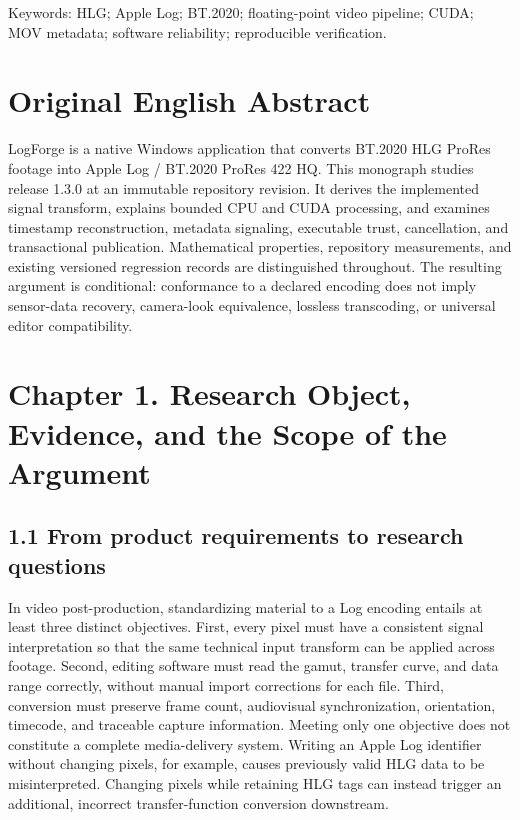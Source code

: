 \documentclass[11pt,a4paper,openany]{book}
\begin{document}
Keywords: HLG; Apple Log; BT.2020; floating-point video pipeline; CUDA; MOV metadata; software reliability; reproducible verification.


\chapter*{Original English Abstract}
LogForge is a native Windows application that converts BT.2020 HLG ProRes footage into Apple Log / BT.2020 ProRes 422 HQ. This monograph studies release 1.3.0 at an immutable repository revision. It derives the implemented signal transform, explains bounded CPU and CUDA processing, and examines timestamp reconstruction, metadata signaling, executable trust, cancellation, and transactional publication. Mathematical properties, repository measurements, and existing versioned regression records are distinguished throughout. The resulting argument is conditional: conformance to a declared encoding does not imply sensor-data recovery, camera-look equivalence, lossless transcoding, or universal editor compatibility.


\chapter*{Chapter 1. Research Object, Evidence, and the Scope of the Argument}

\section*{1.1 From product requirements to research questions}
In video post-production, standardizing material to a Log encoding entails at least three distinct objectives. First, every pixel must have a consistent signal interpretation so that the same technical input transform can be applied across footage. Second, editing software must read the gamut, transfer curve, and data range correctly, without manual import corrections for each file. Third, conversion must preserve frame count, audiovisual synchronization, orientation, timecode, and traceable capture information. Meeting only one objective does not constitute a complete media-delivery system. Writing an Apple Log identifier without changing pixels, for example, causes previously valid HLG data to be misinterpreted. Changing pixels while retaining HLG tags can instead trigger an additional, incorrect transfer-function conversion downstream.
\end{document}
